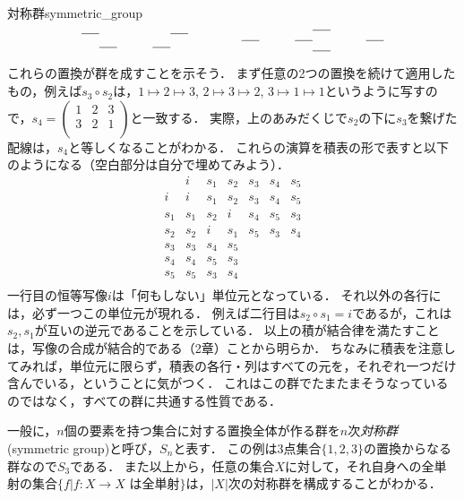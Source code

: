 \documentclass[11pt,a4paper]{jsarticle}
\begin{document}
\begin{rei}{対称群}{symmetric_group}
\[\begin{tikzpicture}
        \draw (0,.7) -- (.5,.7);
        \draw (.5,.3) -- (1,.3);
    
        \draw (2,.3) -- (2.5,.3);
        \draw (2.5,.7) -- (3,.7);
    
        \draw (4.5,.5) -- (5,.5);
    
        \draw (7,.8) -- (6.5,.8);
        \draw (6,.5) -- (6.5,.5);
        \draw (7,.2) -- (6.5,.2);
    
        \draw (8,.5) -- (8.5,.5);
    \end{tikzpicture}\]    

    これらの置換が群を成すことを示そう．
    まず任意の2つの置換を続けて適用したもの，例えば$s_3 \circ s_2$は，$1\mapsto2\mapsto3$, $2\mapsto3\mapsto2$, $3\mapsto1\mapsto1$というように写すので，$ s_4 = 
    \left( \begin{smallmatrix}
        1 & 2 & 3 \\
        3 & 2 & 1 \\
    \end{smallmatrix} \right)$と一致する．
    実際，上のあみだくじで$s_2$の下に$s_3$を繋げた配線は，$s_4$と等しくなることがわかる．
    これらの演算を積表の形で表すと以下のようになる（空白部分は自分で埋めてみよう）．
    \[
        \begin{array}{c|cccccc}
               & i & s_1 & s_2 & s_3 & s_4 & s_5 \\ \hline
               i & i & s_1 & s_2 & s_3 & s_4 & s_5 \\ 
               s_1 & s_1 & s_2 & i &  s_4 & s_5 & s_3  \\ 
               s_2 & s_2 & i & s_1 &  s_5 & s_3 & s_4 \\ 
               s_3 & s_3 & s_4 & s_5 &  &  &  \\ 
               s_4 & s_4 & s_5 & s_3 & & &  \\ 
               s_5 & s_5 & s_3 & s_4 & &  &  \\ 
             
        \end{array}
    \]
    一行目の恒等写像$i$は「何もしない」単位元となっている．
    それ以外の各行には，必ず一つこの単位元が現れる．
    例えば二行目は$s_2 \circ s_1 = i$であるが，これは$s_2, s_1$が互いの逆元であることを示している．
    以上の積が結合律を満たすことは，写像の合成が結合的である（2章）ことから明らか．
    ちなみに積表を注意してみれば，単位元に限らず，積表の各行・列はすべての元を，それぞれ一つだけ含んでいる，ということに気がつく．
    これはこの群でたまたまそうなっているのではなく，すべての群に共通する性質である．

    一般に，$n$個の要素を持つ集合に対する置換全体が作る群を$n$次\emph{対称群}(symmetric group)と呼び，$S_n$と表す．
    この例は3点集合$\{1, 2, 3\}$の置換からなる群なので$S_3$である．
    また以上から，任意の集合$X$に対して，それ自身への全単射の集合$\{f | f:X \to X \text{ は全単射} \}$は，$|X|$次の対称群を構成することがわかる．
\end{rei}
\end{document}

